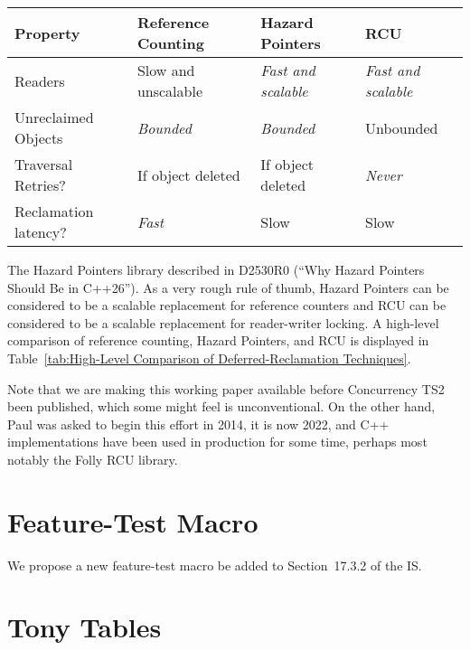 \begin{table*}
\renewcommand*{\arraystretch}{1.25}
\footnotesize
\centering
\begin{tabular}{l|lll}
	Property
		& Reference Counting
			& Hazard Pointers
				& RCU \\
	\hline
	\hline
	Readers
		& Slow and unscalable
			& \emph{Fast and scalable}
				& \emph{Fast and scalable} \\
	\hline
	Unreclaimed Objects
		& \emph{Bounded}
			& \emph{Bounded}
				& Unbounded \\
	\hline
	Traversal Retries?
		& If object deleted
			& If object deleted
				& \emph{Never} \\
	\hline
	Reclamation latency?
		& \emph{Fast}
			& Slow
				& Slow \\
\end{tabular}
\caption{High-Level Comparison of Deferred-Reclamation Techniques}
\label{tab:High-Level Comparison of Deferred-Reclamation Techniques}
\end{table*}

The Hazard Pointers library described in D2530R0 (``Why Hazard Pointers
Should Be in C++26'').
As a very rough rule of thumb, Hazard Pointers can be considered to be
a scalable replacement for reference counters and RCU can be considered
to be a scalable replacement for reader-writer locking.
A high-level comparison of reference counting, Hazard Pointers, and RCU
is displayed in
Table~\ref{tab:High-Level Comparison of Deferred-Reclamation Techniques}.

Note that we are making this working paper available before Concurrency
TS2 been published, which some might feel is unconventional.
On the other hand, Paul was asked to begin this effort in 2014, it is now
2022, and C++ implementations have been used in production for some time,
perhaps most notably the Folly RCU library.

\section{Feature-Test Macro}
\label{sec:Feature-Test Macro}

We propose a new feature-test macro
 be added to Section~17.3.2 of the IS.

\section{Tony Tables}
\label{sec:Tony Tables}

